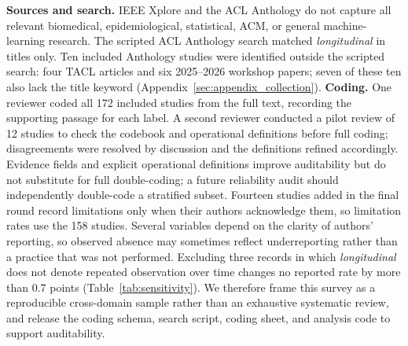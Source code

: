 \documentclass[11pt]{article}
\theoremstyle{plain}
\theoremstyle{definition}
\theoremstyle{remark}
\begin{document}
\textbf{Sources and search.}
IEEE Xplore and the ACL Anthology do not capture all relevant
biomedical, epidemiological, statistical, ACM, or general
machine-learning research. The scripted ACL Anthology search
matched \emph{longitudinal} in titles only. Ten included
Anthology studies were identified outside the scripted search:
four TACL articles and six 2025--2026 workshop papers;
seven of these ten also lack the title keyword
(Appendix~\ref{sec:appendix_collection}).
\textbf{Coding.} One reviewer coded all 172 included studies from the full text, recording the supporting passage for each label. A second reviewer conducted a pilot review of 12 studies to check the codebook and operational definitions before full coding; disagreements were resolved by discussion and the definitions refined accordingly. Evidence fields and explicit operational definitions improve auditability but do not substitute for full double-coding; a future reliability audit should independently double-code a stratified subset. Fourteen studies added in the final round record limitations only when their authors acknowledge them, so limitation rates use the 158  studies. Several variables depend on the clarity of authors' reporting, so observed absence may sometimes reflect underreporting rather than a practice that was not performed. Excluding three records in which \emph{longitudinal} does not denote repeated observation over time changes no reported rate by more than 0.7 points (Table~\ref{tab:sensitivity}). We therefore frame this survey as a reproducible cross-domain sample rather than an exhaustive systematic review, and release the coding schema, search script, coding sheet, and analysis code to support auditability.
\end{document}
